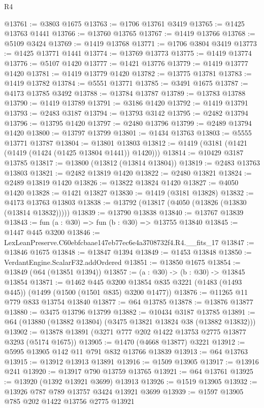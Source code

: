 \begin{lexlean}{R4}
\begin{coremodule}
@13761 := @3803 @1675
@13763 := @1706 @13761 @3419
@13765 := @1425 @13763 @1441
@13766 := @13760 @13765
@13767 := @1419 @13766
@13768 := @5109 @3424
@13769 := @1419 @13768
@13771 := @1706 @3804 @3419
@13773 := @1425 @13771 @1441
@13774 := @13769 @13773
@13775 := @1419 @13774
@13776 := @5107 @1420
@13777 := @1421 @13776
@13779 := @1419 @13777 @1420
@13781 := @1419 @13779 @1420
@13782 := @13775 @13781
@13783 := @1419 @13782
@13784 := @5551 @13771
@13785 := @3491 @1675
@13787 := @4173 @13785 @3492
@13788 := @13784 @13787
@13789 := @13783 @13788
@13790 := @1419 @13789
@13791 := @3186 @1420
@13792 := @1419 @13791
@13793 := @2483 @3187
@13794 := @13793 @3142
@13795 := @2482 @13794
@13796 := @13795 @1420
@13797 := @2480 @13796
@13799 := @2489 @13794 @1420
@13800 := @13797 @13799
@13801 := @1434 @13763
@13803 := @5555 @13771 @13787
@13804 := @13801 @13803
@13812 := @1419 (@3181 (@1421 (@1419 (@1424 (@1425 @13804 @1441)) @1420)))
@13814 := @10429 @3187 @13785
@13817 := @13800 (@13812 (@13814 @13804))
@13819 := @2483 @13763 @13803
@13821 := @2482 @13819 @1420
@13822 := @2480 @13821
@13824 := @2489 @13819 @1420
@13826 := @13822 @13824 @1420
@13827 := @4050 @1420
@13828 := @1421 @13827
@13830 := @1419 (@3181 @13828)
@13832 := @4173 @13763 @13803
@13838 := @13792 (@13817 (@4050 (@13826 (@13830 (@13814 @13832)))))
@13839 := @13790 @13838
@13840 := @13767 @13839
@13843 := fun (a : @30) => fun (b : @30) => @13755 @13840
@13845 := @1447 @445 @3200
@13846 := LexLeanPreserve.C60ebfcbaae147eb77ec6e4a3708732f4.R4.__fits_17
@13847 := @13846 @1675
@13848 := @13847 @1394
@13849 := @1453 @13848
@13850 := VerdantEngine.ScalarF32.addOrdered
@13851 := @13850 @1675
@13854 := @13849 (@64 (@13851 @1394))
@13857 := (a : @30) -> (b : @30) -> @13845 @13854
@13871 := @1462
    @445
    @3200
    @13854
    @835
    @3221
    (@1483 (@1493 @445))
    (@1499 (@1500 (@1501 @835) @3200 @1477))
@13876 := @11265 @11 @779 @833 @13754 @13840
@13877 := @64 @13785
@13878 := @13876 @13877
@13880 := @3475 @13796 @13799
@13882 := @10434 @3187 @13785
@13891 := @64 (@13880 (@13882 @13804) (@3475 @13821 @13824 @38 (@13882 @13832)))
@13902 := @13878 @13891 (@3271 @777 @202 @1422 @13753 @2775 @13877 @3293 (@5174 @1675))
@13905 := @1470 (@4668 @13877) @3221
@13912 := @5995 @13905 @142 @11 @791 @832 @13766 @13839
@13913 := @64 @13763
@13915 := @13912 @13913 @13891
@13916 := @1509 @13905
@13917 := @13916 @241
@13920 := @13917 @790 @13759 @13765
@13921 := @64 @13761
@13925 := @13920 (@1392 @13921 @3699) @13913
@13926 := @1519 @13905
@13932 := @13926 @787 @789 @13757 @3424 @13921 @3699
@13939 := @1597 @13905 @785 @202 @1422 @13756 @2775 @13921

\end{coremodule}
\end{lexlean}
